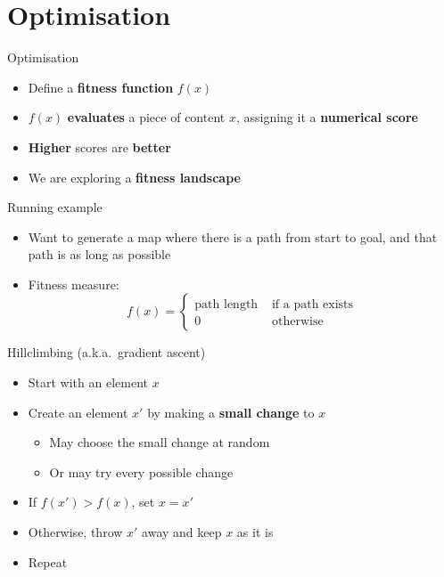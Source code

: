 \part{Optimisation}
\frame{\partpage}

\begin{frame}{Optimisation}
	\begin{itemize}
		\pause\item Define a \textbf{fitness function} $f(x)$
		\pause\item $f(x)$ \textbf{evaluates} a piece of content $x$, assigning it a \textbf{numerical score}
		\pause\item \textbf{Higher} scores are \textbf{better}
		\pause\item We are exploring a \textbf{fitness landscape}
	\end{itemize}
\end{frame}

\begin{frame}{Running example}
	\begin{itemize}
		\pause\item Want to generate a map where there is a path from start to goal,
			and that path is as long as possible
		\pause\item Fitness measure:
		$$ f(x) = \begin{cases}
			\text{path length} & \text{ if a path exists} \\
			0 & \text{ otherwise}
		\end{cases} $$
	\end{itemize}
\end{frame}

\begin{frame}{Hillclimbing (a.k.a.\ gradient ascent)}
	\begin{itemize}
		\pause\item Start with an element $x$
		\pause\item Create an element $x'$ by making a \textbf{small change} to $x$
			\begin{itemize}
				\pause\item May choose the small change at random
				\pause\item Or may try every possible change
			\end{itemize}
		\pause\item If $f(x') > f(x)$, set $x = x'$
		\pause\item Otherwise, throw $x'$ away and keep $x$ as it is
		\pause\item Repeat
	\end{itemize}
\end{frame}

